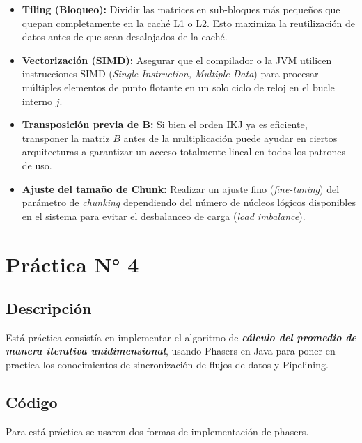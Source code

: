 \documentclass[12pt,a4paper]{article}
\begin{document}
\begin{itemize}
    \item \textbf{Tiling (Bloqueo):} Dividir las matrices en sub-bloques más pequeños que quepan completamente en la caché L1 o L2. Esto maximiza la reutilización de datos antes de que sean desalojados de la caché.
    \item \textbf{Vectorización (SIMD):} Asegurar que el compilador o la JVM utilicen instrucciones SIMD (\textit{Single Instruction, Multiple Data}) para procesar múltiples elementos de punto flotante en un solo ciclo de reloj en el bucle interno $j$.
    \item \textbf{Transposición previa de B:} Si bien el orden IKJ ya es eficiente, transponer la matriz $B$ antes de la multiplicación puede ayudar en ciertos arquitecturas a garantizar un acceso totalmente lineal en todos los patrones de uso.
    \item \textbf{Ajuste del tamaño de Chunk:} Realizar un ajuste fino (\textit{fine-tuning}) del parámetro de \textit{chunking} dependiendo del número de núcleos lógicos disponibles en el sistema para evitar el desbalanceo de carga (\textit{load imbalance}).
\end{itemize}


\section{Práctica N° 4}
\subsection{Descripción}
Está práctica consistía en implementar el algoritmo de \textit{\textbf{cálculo del promedio de manera iterativa unidimensional}}, usando Phasers en Java para poner en practica los conocimientos de sincronización de flujos de datos y Pipelining.

\subsection{Código}
Para está práctica se usaron dos formas de implementación de phasers.
\end{document}
